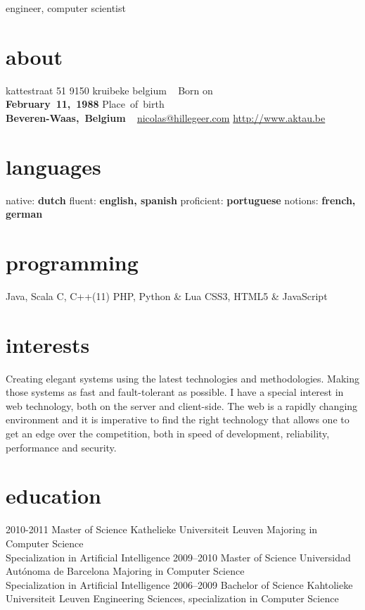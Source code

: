 \documentclass[]{friggeri-cv}
\begin{document}
       {engineer, computer scientist}


\begin{aside}
  \section{about}
    kattestraat 51
    9150 kruibeke
    belgium
    ~
    Born on\\\textbf{February~11,~1988}
    Place~of~birth\\\textbf{Beveren-Waas,~Belgium}
    ~
    \href{mailto:nicolas@hillegeer.com}{nicolas@hillegeer.com}
    \href{http://www.aktau.be}{http://www.aktau.be}
  \section{languages}
    native: \textbf{dutch}
    fluent: \textbf{english, spanish}
    proficient: \textbf{portuguese}
    notions: \textbf{french, german}
  \section{programming}
    Java, Scala
    C, C++(11)
    PHP, Python \& Lua
    CSS3, HTML5 \& JavaScript
\end{aside}

\section{interests}

Creating elegant systems using the latest technologies and methodologies. Making those systems as fast and fault-tolerant as possible.
I have a special interest in web technology, both on the server and client-side. The web is a rapidly changing environment and
it is imperative to find the right technology that allows one to get an edge over the competition, both in
speed of development, reliability, performance and security.

\section{education}

\begin{entrylist}
  \entry
    {2010-2011}
    {Master of Science}
    {Kathelieke Universiteit Leuven}
    {Majoring in Computer Science\\
    Specialization in Artificial Intelligence}
  \entry
    {2009–2010}
    {Master of Science}
    {Universidad Autónoma de Barcelona}
    {Majoring in Computer Science\\
    Specialization in Artificial Intelligence}
  \entry
    {2006–2009}
    {Bachelor of Science}
    {Kahtolieke Universiteit Leuven}
    {Engineering Sciences, specialization in Computer Science}
\end{entrylist}
\end{document}
